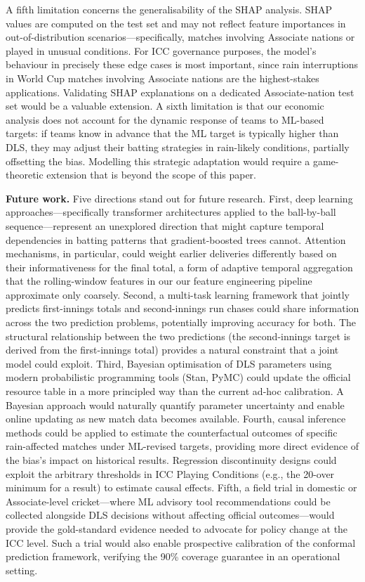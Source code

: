 \documentclass[10pt,a4paper,twocolumn]{article}
\begin{document}
A fifth limitation concerns the generalisability of the SHAP analysis. SHAP values are computed on the test set and may not reflect feature importances in out-of-distribution scenarios---specifically, matches involving Associate nations or played in unusual conditions. For ICC governance purposes, the model's behaviour in precisely these edge cases is most important, since rain interruptions in World Cup matches involving Associate nations are the highest-stakes applications. Validating SHAP explanations on a dedicated Associate-nation test set would be a valuable extension. A sixth limitation is that our economic analysis does not account for the dynamic response of teams to ML-based targets: if teams know in advance that the ML target is typically higher than DLS, they may adjust their batting strategies in rain-likely conditions, partially offsetting the bias. Modelling this strategic adaptation would require a game-theoretic extension that is beyond the scope of this paper.

\textbf{Future work.} Five directions stand out for future research. First, deep learning approaches---specifically transformer architectures applied to the ball-by-ball sequence---represent an unexplored direction that might capture temporal dependencies in batting patterns that gradient-boosted trees cannot. Attention mechanisms, in particular, could weight earlier deliveries differently based on their informativeness for the final total, a form of adaptive temporal aggregation that the rolling-window features in our our feature engineering pipeline approximate only coarsely. Second, a multi-task learning framework that jointly predicts first-innings totals and second-innings run chases could share information across the two prediction problems, potentially improving accuracy for both. The structural relationship between the two predictions (the second-innings target is derived from the first-innings total) provides a natural constraint that a joint model could exploit. Third, Bayesian optimisation of DLS parameters using modern probabilistic programming tools (Stan, PyMC) could update the official resource table in a more principled way than the current ad-hoc calibration. A Bayesian approach would naturally quantify parameter uncertainty and enable online updating as new match data becomes available. Fourth, causal inference methods could be applied to estimate the counterfactual outcomes of specific rain-affected matches under ML-revised targets, providing more direct evidence of the bias's impact on historical results. Regression discontinuity designs could exploit the arbitrary thresholds in ICC Playing Conditions (e.g., the 20-over minimum for a result) to estimate causal effects. Fifth, a field trial in domestic or Associate-level cricket---where ML advisory tool recommendations could be collected alongside DLS decisions without affecting official outcomes---would provide the gold-standard evidence needed to advocate for policy change at the ICC level. Such a trial would also enable prospective calibration of the conformal prediction framework, verifying the 90\% coverage guarantee in an operational setting.
\end{document}
